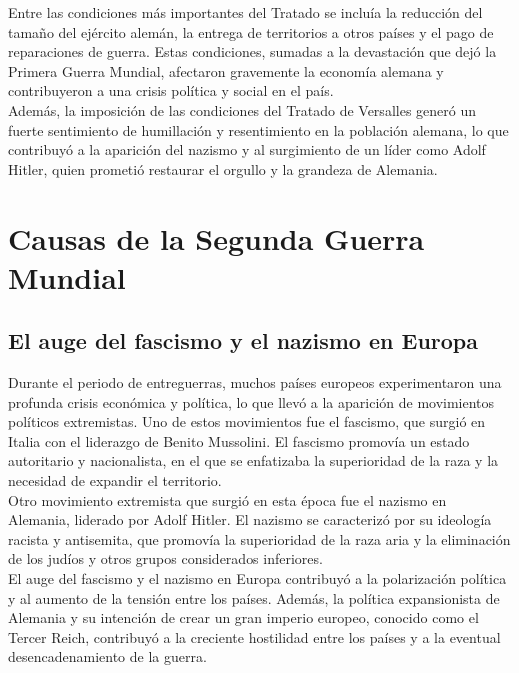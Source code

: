 \documentclass{article}
\theoremstyle{mytheoremstyle}
\theoremstyle{mytheoremstyle}
\theoremstyle{myproblemstyle}
\begin{document}
Entre las condiciones más importantes del Tratado se incluía la reducción del tamaño del ejército alemán, la entrega de territorios a otros países y el pago de reparaciones de guerra. Estas condiciones, sumadas a la devastación que dejó la Primera Guerra Mundial, afectaron gravemente la economía alemana y contribuyeron a una crisis política y social en el país.\\

Además, la imposición de las condiciones del Tratado de Versalles generó un fuerte sentimiento de humillación y resentimiento en la población alemana, lo que contribuyó a la aparición del nazismo y al surgimiento de un líder como Adolf Hitler, quien prometió restaurar el orgullo y la grandeza de Alemania.\\
\newpage
    \section{Causas de la Segunda Guerra Mundial}

    \subsection{El auge del fascismo y el nazismo en Europa}
    Durante el periodo de entreguerras, muchos países europeos experimentaron una profunda crisis económica y política, lo que llevó a la aparición de movimientos políticos extremistas. Uno de estos movimientos fue el fascismo, que surgió en Italia con el liderazgo de Benito Mussolini. El fascismo promovía un estado autoritario y nacionalista, en el que se enfatizaba la superioridad de la raza y la necesidad de expandir el territorio.\\

Otro movimiento extremista que surgió en esta época fue el nazismo en Alemania, liderado por Adolf Hitler. El nazismo se caracterizó por su ideología racista y antisemita, que promovía la superioridad de la raza aria y la eliminación de los judíos y otros grupos considerados inferiores.\\

El auge del fascismo y el nazismo en Europa contribuyó a la polarización política y al aumento de la tensión entre los países. Además, la política expansionista de Alemania y su intención de crear un gran imperio europeo, conocido como el Tercer Reich, contribuyó a la creciente hostilidad entre los países y a la eventual desencadenamiento de la guerra.\\
\end{document}
